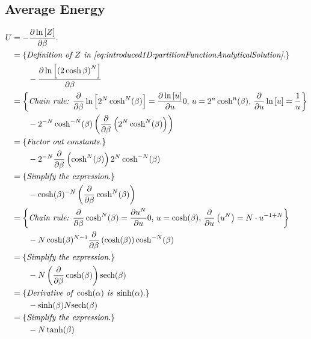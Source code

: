 \subsection{Average Energy}
	\label{a:derivations:averageEnergy}
	\begin{align*}
		\averageEnergy 
			& = - \frac{\partial \ln \left[ \partitionfunction \right]}{\partial \beta}.\\
		\comment{
			\textit{Definition of \partitionfunction in \cref{eq:introduced1D:partitionFunctionAnalyticalSolution}}.
		}
		\content{
			- \frac{\partial \ln \left[ \left(2 \cosh \beta \right)^N \right]}{\partial \beta}
		}
		\comment{
			\textit{Chain rule: } 
			\frac{\partial}{\partial \beta}\ln\left[2^N \cosh^N(\beta) \right] = \frac{\partial \ln\left[ u \right]}{\partial u} 0, \, 
			u = 2^n \cosh^n(\beta),\,
			\frac{\partial}{\partial u} \ln\left[ u \right] = \frac{1}{u}
		}
		\content{
			- 2^{-N} \cosh^{-N}(\beta) \left( \frac{\partial}{\partial \beta} \left( 2^N \cosh^N(\beta)\right)\right)
		}
		\comment{
			\textit{Factor out constants.}
		}
		\content{
 			- 2^{- N} \frac{\partial}{\partial \beta}\left(\cosh^{N}(\beta)\right) 2^{N} \cosh^{-N}(\beta)
		}
		\comment{
			\textit{Simplify the expression.}
		}
		\content{
			-\cosh(\beta) ^{-N} \left(\frac{\partial}{\partial \beta} \cosh^{N}(\beta)\right)
		}
		\comment{
			\textit{Chain rule: } \frac{\partial}{\partial \beta} \cosh^{N}(\beta)=\frac{\partial u^N}{\partial u} 0,\, 
			u = \cosh(\beta),\, 
			\frac{\partial}{\partial u}\left(u^N\right) = N \cdot u^{-1 + N}
		}
		\content{
			- N \cosh(\beta)^{N-1} \frac{\partial}{\partial \beta}\left( \cosh (\beta) \right) \cosh^{-N} (\beta)
		}
		\comment{
			\textit{Simplify the expression.}
		}
		\content{
			- N \left(\frac{\partial}{\partial \beta} \cosh(\beta) \right) \text{sech}(\beta)
		}
		\comment{
			\textit{Derivative of } \cosh(\alpha) \textit{ is } \sinh(\alpha).
		}
		\content{
			- \sinh(\beta) N \text{sech}(\beta)
		}
		\comment{
			\textit{Simplify the expression.}
		}
		\content{
		- N \tanh(\beta)
		}
	\end{align*}

